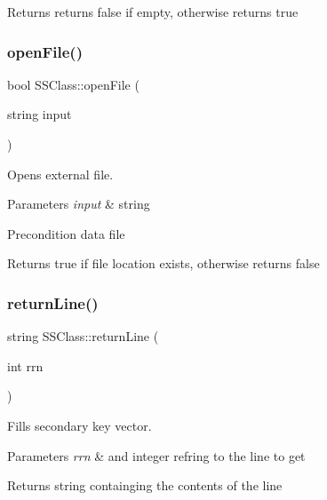 \begin{DoxyReturn}{Returns}
returns false if empty, otherwise returns true 
\end{DoxyReturn}
\mbox{\label{classSSClass_a92e012441608ea36f3013fb3cbea9da8}} 
\subsubsection{\texorpdfstring{open\+File()}{openFile()}}
{\footnotesize\ttfamily bool S\+S\+Class\+::open\+File (\begin{DoxyParamCaption}\item[{string}]{input }\end{DoxyParamCaption})}



Opens external file. 


\begin{DoxyParams}{Parameters}
{\em input} & string \\
\hline
\end{DoxyParams}
\begin{DoxyPrecond}{Precondition}
data file 
\end{DoxyPrecond}
\begin{DoxyReturn}{Returns}
true if file location exists, otherwise returns false 
\end{DoxyReturn}
\mbox{\label{classSSClass_ab0a8ea1af895df28359b5733bd920ef3}} 
\subsubsection{\texorpdfstring{return\+Line()}{returnLine()}}
{\footnotesize\ttfamily string S\+S\+Class\+::return\+Line (\begin{DoxyParamCaption}\item[{int}]{rrn }\end{DoxyParamCaption})}



Fills secondary key vector. 


\begin{DoxyParams}{Parameters}
{\em rrn} & and integer refring to the line to get \\
\hline
\end{DoxyParams}
\begin{DoxyReturn}{Returns}
string containging the contents of the line 
\end{DoxyReturn}
\mbox{\label{classSSClass_a9df3598c000a6a5e9ef994d19196e69f}} 
